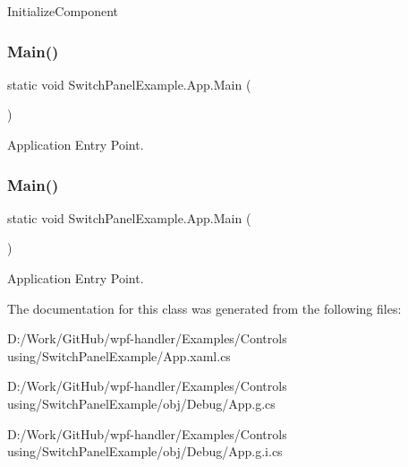 Initialize\+Component 

\mbox{\label{class_switch_panel_example_1_1_app_a562447ab2fb7c5cc3d22577b49dd93fd}} 
\subsubsection{\texorpdfstring{Main()}{Main()}\hspace{0.1cm}{\footnotesize\ttfamily [1/2]}}
{\footnotesize\ttfamily static void Switch\+Panel\+Example.\+App.\+Main (\begin{DoxyParamCaption}{ }\end{DoxyParamCaption})\hspace{0.3cm}{\ttfamily [static]}}



Application Entry Point. 

\mbox{\label{class_switch_panel_example_1_1_app_a562447ab2fb7c5cc3d22577b49dd93fd}} 
\subsubsection{\texorpdfstring{Main()}{Main()}\hspace{0.1cm}{\footnotesize\ttfamily [2/2]}}
{\footnotesize\ttfamily static void Switch\+Panel\+Example.\+App.\+Main (\begin{DoxyParamCaption}{ }\end{DoxyParamCaption})\hspace{0.3cm}{\ttfamily [static]}}



Application Entry Point. 



The documentation for this class was generated from the following files\+:\begin{DoxyCompactItemize}
\item 
D\+:/\+Work/\+Git\+Hub/wpf-\/handler/\+Examples/\+Controls using/\+Switch\+Panel\+Example/App.\+xaml.\+cs\item 
D\+:/\+Work/\+Git\+Hub/wpf-\/handler/\+Examples/\+Controls using/\+Switch\+Panel\+Example/obj/\+Debug/App.\+g.\+cs\item 
D\+:/\+Work/\+Git\+Hub/wpf-\/handler/\+Examples/\+Controls using/\+Switch\+Panel\+Example/obj/\+Debug/App.\+g.\+i.\+cs\end{DoxyCompactItemize}
